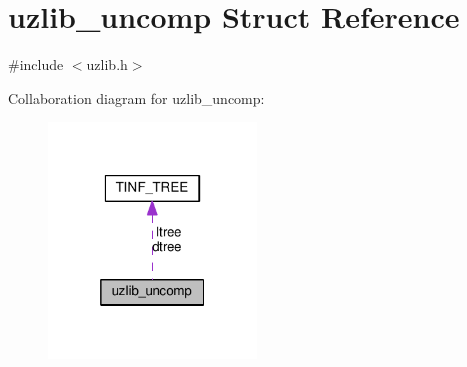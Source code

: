 \hypertarget{structuzlib__uncomp}{}\section{uzlib\+\_\+uncomp Struct Reference}
\label{structuzlib__uncomp}


{\ttfamily \#include $<$uzlib.\+h$>$}



Collaboration diagram for uzlib\+\_\+uncomp\+:
\nopagebreak
\begin{figure}[H]
\begin{center}
\leavevmode
\includegraphics[width=157pt]{structuzlib__uncomp__coll__graph}
\end{center}
\end{figure}
